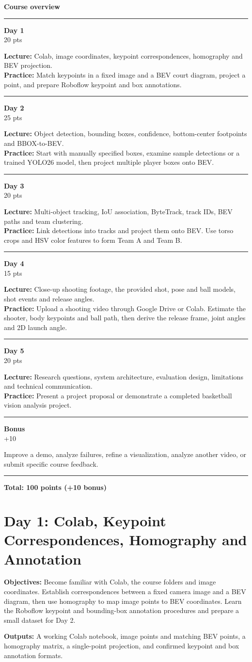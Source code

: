 \documentclass[11pt,a4paper]{article}
\newcommand{\overviewitem}[4]{%
  \noindent
  \begin{minipage}[t]{0.12\textwidth}
    \textbf{#1}\\[-0.5mm]
    {\scriptsize #4}
  \end{minipage}
  \hfill
  \begin{minipage}[t]{0.84\textwidth}
    {\scriptsize\textbf{Lecture:} #2}\\[-0.2mm]
    {\scriptsize\textbf{Practice:} #3}
  \end{minipage}
  \par\vspace{1.2mm}
  \hrule
  \vspace{1.2mm}
}
\newcommand{\daybox}[2]{%
  \begin{tcolorbox}[colback=SoftGray,colframe=DarkGray,arc=1mm,boxrule=0.45pt,left=2.5mm,right=2.5mm,top=2mm,bottom=2mm]
    \textbf{Objectives:} #1

    \vspace{1mm}
    \textbf{Outputs:} #2
  \end{tcolorbox}
}
\begin{document}
\begin{tcolorbox}[colback=SoftGray,colframe=DarkGray,arc=1mm,boxrule=0.45pt,left=3mm,right=3mm,top=2mm,bottom=2mm]
  {\large\bfseries Course overview}
  \vspace{2mm}\hrule\vspace{1.5mm}

\overviewitem{Day 1}{Colab, image coordinates, keypoint correspondences, homography and BEV projection.}{Match keypoints in a fixed image and a BEV court diagram, project a point, and prepare Roboflow keypoint and box annotations.}{20 pts}
  \overviewitem{Day 2}{Object detection, bounding boxes, confidence, bottom-center footpoints and BBOX-to-BEV.}{Start with manually specified boxes, examine sample detections or a trained YOLO26 model, then project multiple player boxes onto BEV.}{25 pts}
  \overviewitem{Day 3}{Multi-object tracking, IoU association, ByteTrack, track IDs, BEV paths and team clustering.}{Link detections into tracks and project them onto BEV. Use torso crops and HSV color features to form Team A and Team B.}{20 pts}
  \overviewitem{Day 4}{Close-up shooting footage, the provided shot, pose and ball models, shot events and release angles.}{Upload a shooting video through Google Drive or Colab. Estimate the shooter, body keypoints and ball path, then derive the release frame, joint angles and 2D launch angle.}{15 pts}
  \overviewitem{Day 5}{Research questions, system architecture, evaluation design, limitations and technical communication.}{Present a project proposal or demonstrate a completed basketball vision analysis project.}{20 pts}

  \noindent
  \begin{minipage}[t]{0.12\textwidth}\textbf{Bonus}\\[-0.5mm]{\scriptsize +10}\end{minipage}
  \hfill
  \begin{minipage}[t]{0.84\textwidth}{\scriptsize Improve a demo, analyze failures, refine a visualization, analyze another video, or submit specific course feedback.}\end{minipage}

  \vspace{2mm}\hrule\vspace{1.5mm}
  \hfill {\bfseries Total: 100 points (+10 bonus)}
\end{tcolorbox}

\clearpage

\section{Day 1: Colab, Keypoint Correspondences, Homography and Annotation}
\daybox{Become familiar with Colab, the course folders and image coordinates. Establish correspondences between a fixed camera image and a BEV diagram, then use homography to map image points to BEV coordinates. Learn the Roboflow keypoint and bounding-box annotation procedures and prepare a small dataset for Day 2.}{A working Colab notebook, image points and matching BEV points, a homography matrix, a single-point projection, and confirmed keypoint and box annotation formats.}
\end{document}
